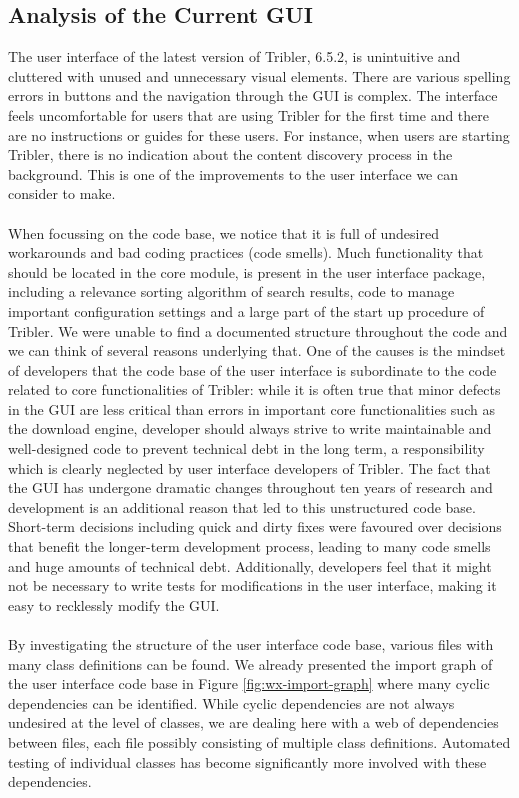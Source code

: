 \subsection{Analysis of the Current GUI}
The user interface of the latest version of Tribler, 6.5.2, is unintuitive and cluttered with unused and unnecessary visual elements. There are various spelling errors in buttons and the navigation through the GUI is complex. The interface feels uncomfortable for users that are using Tribler for the first time and there are no instructions or guides for these users. For instance, when users are starting Tribler, there is no indication about the content discovery process in the background. This is one of the improvements to the user interface we can consider to make.\\\\
When focussing on the code base, we notice that it is full of undesired workarounds and bad coding practices (code smells). Much functionality that should be located in the core module, is present in the user interface package, including a relevance sorting algorithm of search results, code to manage important configuration settings and a large part of the start up procedure of Tribler. We were unable to find a documented structure throughout the code and we can think of several reasons underlying that. One of the causes is the mindset of developers that the code base of the user interface is subordinate to the code related to core functionalities of Tribler: while it is often true that minor defects in the GUI are less critical than errors in important core functionalities such as the download engine, developer should always strive to write maintainable and well-designed code to prevent technical debt in the long term, a responsibility which is clearly neglected by user interface developers of Tribler. The fact that the GUI has undergone dramatic changes throughout ten years of research and development is an additional reason that led to this unstructured code base. Short-term decisions including quick and dirty fixes were favoured over decisions that benefit the longer-term development process, leading to many code smells and huge amounts of technical debt. Additionally, developers feel that it might not be necessary to write tests for modifications in the user interface, making it easy to recklessly modify the GUI.\\\\
By investigating the structure of the user interface code base, various files with many class definitions can be found. We already presented the import graph of the user interface code base in Figure \ref{fig:wx-import-graph} where many cyclic dependencies can be identified. While cyclic dependencies are not always undesired at the level of classes, we are dealing here with a web of dependencies between files, each file possibly consisting of multiple class definitions. Automated testing of individual classes has become significantly more involved with these dependencies.\\\\

